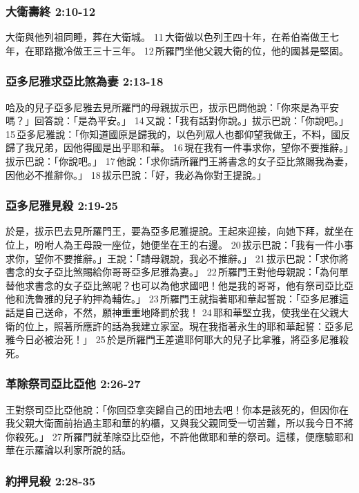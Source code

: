 \subsubsection{大衛壽終 2:10-12}
大衛與他列祖同睡，葬在大衛城。 11 大衛做以色列王四十年，在希伯崙做王七年，在耶路撒冷做王三十三年。 12 所羅門坐他父親大衛的位，他的國甚是堅固。
 
\subsubsection{亞多尼雅求亞比煞為妻 2:13-18}
哈及的兒子亞多尼雅去見所羅門的母親拔示巴，拔示巴問他說：「你來是為平安嗎？」回答說：「是為平安。」 14 又說：「我有話對你說。」拔示巴說：「你說吧。」 15 亞多尼雅說：「你知道國原是歸我的，以色列眾人也都仰望我做王，不料，國反歸了我兄弟，因他得國是出乎耶和華。 16 現在我有一件事求你，望你不要推辭。」拔示巴說：「你說吧。」 17 他說：「求你請所羅門王將書念的女子亞比煞賜我為妻，因他必不推辭你。」 18 拔示巴說：「好，我必為你對王提說。」

\subsubsection{亞多尼雅見殺 2:19-25}
於是，拔示巴去見所羅門王，要為亞多尼雅提說。王起來迎接，向她下拜，就坐在位上，吩咐人為王母設一座位，她便坐在王的右邊。 20 拔示巴說：「我有一件小事求你，望你不要推辭。」王說：「請母親說，我必不推辭。」 21 拔示巴說：「求你將書念的女子亞比煞賜給你哥哥亞多尼雅為妻。」 22 所羅門王對他母親說：「為何單替他求書念的女子亞比煞呢？也可以為他求國吧！他是我的哥哥，他有祭司亞比亞他和洗魯雅的兒子約押為輔佐。」 23 所羅門王就指著耶和華起誓說：「亞多尼雅這話是自己送命，不然，願神重重地降罰於我！ 24 耶和華堅立我，使我坐在父親大衛的位上，照著所應許的話為我建立家室。現在我指著永生的耶和華起誓：亞多尼雅今日必被治死！」 25 於是所羅門王差遣耶何耶大的兒子比拿雅，將亞多尼雅殺死。

\subsubsection{革除祭司亞比亞他 2:26-27}
王對祭司亞比亞他說：「你回亞拿突歸自己的田地去吧！你本是該死的，但因你在我父親大衛面前抬過主耶和華的約櫃，又與我父親同受一切苦難，所以我今日不將你殺死。」 27 所羅門就革除亞比亞他，不許他做耶和華的祭司。這樣，便應驗耶和華在示羅論以利家所說的話。

\subsubsection{約押見殺 2:28-35}

